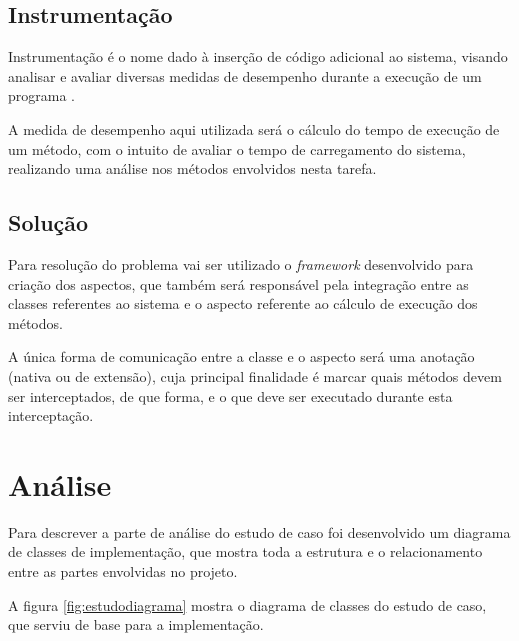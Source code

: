 \documentclass[tc,oneside]{iiufrgs}
\begin{document}
\subsection{Instrumentação}

Instrumentação é o nome dado à inserção de código adicional ao sistema, visando analisar e avaliar diversas medidas de desempenho durante a execução de um programa \cite{cabral2005instrumentaccao} . 

A medida de desempenho aqui utilizada será o cálculo do tempo de execução de um método, com o intuito de avaliar o tempo de carregamento do sistema, realizando uma análise nos métodos envolvidos nesta tarefa.

\subsection{Solução}

Para resolução do problema vai ser utilizado o \textit{framework} desenvolvido para criação dos aspectos, que também será responsável pela integração entre as classes referentes ao sistema e o aspecto referente ao cálculo de execução dos métodos.

A única forma de comunicação entre a classe e o aspecto será uma anotação (nativa ou de extensão), cuja principal finalidade é marcar quais métodos devem ser interceptados, de que forma, e o que deve ser executado durante esta interceptação.

\section{Análise}

Para descrever a parte de análise do estudo de caso foi desenvolvido um diagrama de classes de implementação, que mostra toda a estrutura e o relacionamento entre as partes envolvidas no projeto.

A figura \ref{fig:estudodiagrama} mostra o diagrama de classes do estudo de caso, que serviu de base para a implementação.
\end{document}
